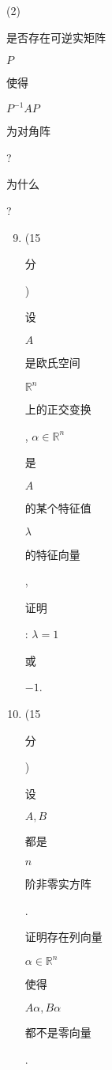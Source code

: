\documentclass[10pt]{article}
\begin{document}
(2) \begin{CJK}{UTF8}{mj}是否存在可逆实矩阵\end{CJK} $P$ \begin{CJK}{UTF8}{mj}使得\end{CJK} $P^{-1} A P$ \begin{CJK}{UTF8}{mj}为对角阵\end{CJK}? \begin{CJK}{UTF8}{mj}为什么\end{CJK}?

\begin{enumerate}
  \setcounter{enumi}{8}
  \item (15 \begin{CJK}{UTF8}{mj}分\end{CJK}) \begin{CJK}{UTF8}{mj}设\end{CJK} $A$ \begin{CJK}{UTF8}{mj}是欧氏空间\end{CJK} $\mathbb{R}^{n}$ \begin{CJK}{UTF8}{mj}上的正交变换\end{CJK}, $\alpha \in \mathbb{R}^{n}$ \begin{CJK}{UTF8}{mj}是\end{CJK} $A$ \begin{CJK}{UTF8}{mj}的某个特征值\end{CJK} $\lambda$ \begin{CJK}{UTF8}{mj}的特征向量\end{CJK}, \begin{CJK}{UTF8}{mj}证明\end{CJK}: $\lambda=1$ \begin{CJK}{UTF8}{mj}或\end{CJK} $-1$.

  \item (15 \begin{CJK}{UTF8}{mj}分\end{CJK}) \begin{CJK}{UTF8}{mj}设\end{CJK} $A, B$ \begin{CJK}{UTF8}{mj}都是\end{CJK} $n$ \begin{CJK}{UTF8}{mj}阶非零实方阵\end{CJK}. \begin{CJK}{UTF8}{mj}证明存在列向量\end{CJK} $\alpha \in \mathbb{R}^{n}$ \begin{CJK}{UTF8}{mj}使得\end{CJK} $A \alpha, B \alpha$ \begin{CJK}{UTF8}{mj}都不是零向量\end{CJK}.

\end{enumerate}
\end{document}
